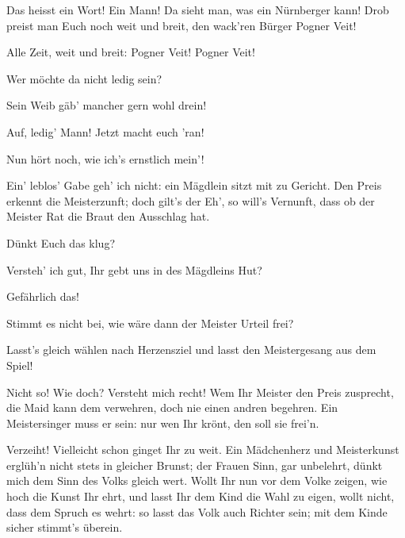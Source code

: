 \begin{drama}


Das heisst ein Wort! Ein Mann!
Da sieht man, was ein Nürnberger kann!
Drob preist man Euch noch weit und breit,
den wack'ren Bürger Pogner Veit!



Alle Zeit, weit und breit:
Pogner Veit! Pogner Veit!

\Vogelgesangspeaks
Wer möchte da nicht ledig sein?

\Sachsspeaks
Sein Weib gäb' mancher gern wohl drein!

\Kothnerspeaks
Auf, ledig' Mann! Jetzt macht euch 'ran!

\Pognerspeaks
Nun hört noch, wie ich's ernstlich mein'!


Ein' leblos' Gabe geh' ich nicht:
ein Mägdlein sitzt mit zu Gericht.
Den Preis erkennt die Meisterzunft;
doch gilt's der Eh', so will's Vernunft,
dass ob der Meister Rat
die Braut den Ausschlag hat.

\Beckmesserspeaks
{}

Dünkt Euch das klug?

\Kothnerspeaks
{}

Versteh' ich gut,
Ihr gebt uns in des Mägdleins Hut?

\Beckmesserspeaks
Gefährlich das!

\Kothnerspeaks
Stimmt es nicht bei,
wie wäre dann der Meister Urteil frei?

\Beckmesserspeaks
Lasst's gleich wählen nach Herzensziel
und lasst den Meistergesang aus dem Spiel!

\Pognerspeaks
Nicht so! Wie doch? Versteht mich recht!
Wem Ihr Meister den Preis zusprecht,
die Maid kann dem verwehren,
doch nie einen andren begehren.
Ein Meistersinger muss er sein:
nur wen Ihr krönt, den soll sie frei'n.

\Sachsspeaks
{}

Verzeiht!
Vielleicht schon ginget Ihr zu weit.
Ein Mädchenherz und Meisterkunst
erglüh'n nicht stets in gleicher Brunst;
der Frauen Sinn, gar unbelehrt,
dünkt mich dem Sinn des Volks gleich wert.
Wollt Ihr nun vor dem Volke zeigen,
wie hoch die Kunst Ihr ehrt,
und lasst Ihr dem Kind die Wahl zu eigen,
wollt nicht, dass dem Spruch es wehrt:
so lasst das Volk auch Richter sein;
mit dem Kinde sicher stimmt's überein.


\end{drama}
